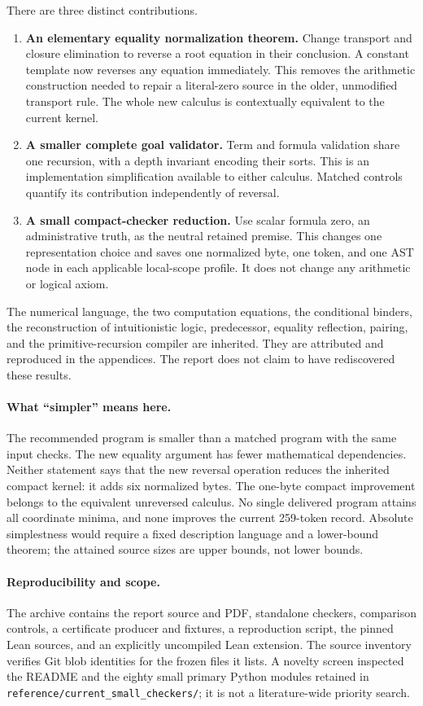\documentclass[11pt,letterpaper]{article}
\theoremstyle{definition}\newtheorem{definition}[theorem]{Definition}
\theoremstyle{remark}\newtheorem{remark}[theorem]{Remark}
\newcommand{\code}[1]{{\small\nolinkurl{#1}}}
\begin{document}
There are three distinct contributions.
\begin{enumerate}
\item \textbf{An elementary equality normalization theorem.} Change
  transport and closure elimination to reverse a root equation in their
  conclusion. A constant template now reverses any equation immediately.
  This removes the arithmetic construction needed to repair a literal-zero
  source in the older, unmodified transport rule. The whole new calculus
  is contextually equivalent to the current kernel.
\item \textbf{A smaller complete goal validator.} Term and formula
  validation share one recursion, with a depth invariant encoding their
  sorts. This is an implementation simplification available to either
  calculus. Matched controls quantify its contribution independently of
  reversal.
\item \textbf{A small compact-checker reduction.} Use scalar formula
  zero, an administrative truth, as the neutral retained premise. This
  changes one representation choice and saves one normalized byte, one
  token, and one AST node in each applicable local-scope profile. It does
  not change any arithmetic or logical axiom.
\end{enumerate}

The numerical language, the two computation equations, the conditional
binders, the reconstruction of intuitionistic logic, predecessor,
equality reflection, pairing, and the primitive-recursion compiler are
inherited. They are attributed and reproduced in the appendices. The
report does not claim to have rediscovered these results.

\paragraph{What ``simpler'' means here.}
The recommended program is smaller than a matched program with the same
input checks. The new equality argument has fewer mathematical
dependencies. Neither statement says that the new reversal operation
reduces the inherited compact kernel: it adds six normalized bytes.
The one-byte compact improvement belongs to the equivalent unreversed
calculus. No single delivered program attains all coordinate minima,
and none improves the current 259-token record. Absolute simplestness
would require a fixed description language and a lower-bound theorem;
the attained source sizes are upper bounds, not lower bounds.

\paragraph{Reproducibility and scope.}
The archive contains the report source and PDF, standalone checkers,
comparison controls, a certificate producer and fixtures, a reproduction
script, the pinned Lean sources, and an explicitly uncompiled Lean
extension. The source inventory verifies Git blob identities for the
frozen files it lists. A novelty screen inspected the README and the
eighty small primary Python modules retained in
\code{reference/current_small_checkers/}; it is not a literature-wide
priority search.

\clearpage
\setcounter{tocdepth}{1}
\begingroup\small\setlength{\parskip}{0pt}\tableofcontents\endgroup
\clearpage
\end{document}
